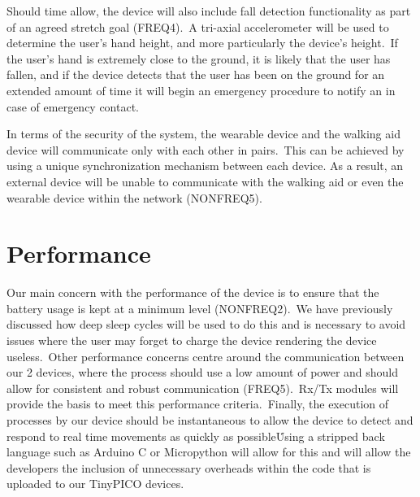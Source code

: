         Should time allow, the device will also include fall detection functionality as part of an agreed stretch goal
        (FREQ4).\ A tri-axial accelerometer will be used to determine the user's hand height, and more particularly the
        device's height.\ If the user's hand is extremely close to the ground, it is likely that the user has fallen, and
        if the device detects that the user has been on the ground for an extended amount of time it will begin an
        emergency procedure to notify an in case of emergency contact.

        In terms of the security of the system, the wearable device and the walking aid device will communicate only
        with each other in pairs.\ This can be achieved by using a unique synchronization mechanism between each device.
        As a result, an external device will be unable to communicate with the walking aid or even the wearable device
        within the network (NONFREQ5).

    \section{Performance}

        Our main concern with the performance of the device is to ensure that the battery usage is kept at a minimum
        level (NONFREQ2).\ We have previously discussed how deep sleep cycles will be used to do this and is necessary to
        avoid issues where the user may forget to charge the device rendering the device useless.\ Other performance
        concerns centre around the communication between our 2 devices, where the process should use a low amount of
        power and should allow for consistent and robust communication (FREQ5).\ Rx/Tx modules will provide the basis to
        meet this performance criteria.\ Finally, the execution of processes by our device should be instantaneous to
        allow the device to detect and respond to real time movements as quickly as possible\. Using a stripped back
        language such as Arduino C or Micropython will allow for this and will allow the developers the inclusion of unnecessary
        overheads within the code that is uploaded to our TinyPICO devices.
